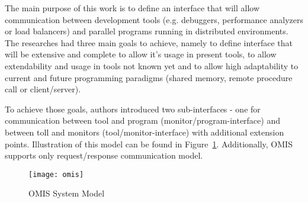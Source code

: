 The main purpose of this work is to define an interface that will allow communication between development tools (e.g. debuggers, performance analyzers or load balancers) and parallel programs running in distributed environments. The researches had three main goals to achieve, namely to define interface that will be extensive and complete to allow it\rq{}s usage in present tools, to allow extendability and usage in tools not known yet and to allow high adaptability to current and future programming paradigms (shared memory, remote procedure call or client/server).

To achieve those goals, authors introduced two sub-interfaces - one for communication between tool and program (monitor/program-interface) and between toll and monitors (tool/monitor-interface) with additional extension points. Illustration of this model can be found in Figure~\ref{fig:omis}. Additionally, OMIS supports only request/response communication model.

\begin{figure}[ht]
  \centering
  \texttt{[image: omis]}
  \caption{OMIS System Model}
  \label{fig:omis}
\end{figure}
  
      
